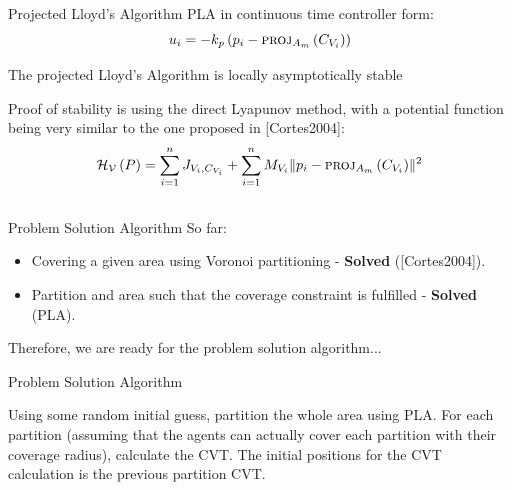 \documentclass[t]{beamer}
\newcommand{\norm}[1]{\lVert #1 \rVert}
\begin{document}
\begin{frame}[label=projlloydsalgotheorem]{Projected Lloyd's Algorithm}
PLA in continuous time controller form:
\begin{equation*} \label{ProjectedLloydsContol}
u_{i} = -k_{p}\left( p_i - \textsc{proj}_{A_m}\left( C_{V_{i}} \right) \right)
\end{equation*} 

\begin{theorem}
The projected Lloyd's Algorithm is locally asymptotically stable
\end{theorem}

Proof of stability is using the direct Lyapunov method, with a potential function being very similar to the one proposed in [Cortes2004]:
\begin{equation*}
\mathcal{H_{V}}\left( P \right) = \sum_{i=1}^{n} J_{V_i,C_{V_i}} + \sum_{i=1}^{n} M_{V_i} \norm{p_i - \textsc{proj}_{A_m}\left( C_{V_i}\right)}^2
\end{equation*}
\end{frame}

\subsection[Problem Solution Algorithm]{}
\begin{frame}[label=probsolalg1]{Problem Solution Algorithm}
So far:
\begin{itemize}
\item Covering a given area using Voronoi partitioning - \textbf{Solved} ([Cortes2004]).
\item Partition and area such that the coverage constraint is fulfilled - \textbf{Solved} (PLA).
\end{itemize}

Therefore, we are ready for the problem solution algorithm...
\end{frame}

\begin{frame}[label=probsolalg2]{Problem Solution Algorithm}
\begin{algorithm}[H]
\caption{Problem Solution Algorithm}\label{GeneralProbSolution}
\begin{algorithmic}[1]
\State Using some random initial guess, partition the whole area using PLA.
\State For each partition (assuming that the agents can actually cover each partition with their coverage radius), calculate the CVT. The initial positions for the CVT calculation is the previous partition CVT.
\end{algorithmic}
\end{algorithm}
\end{frame}
\end{document}
